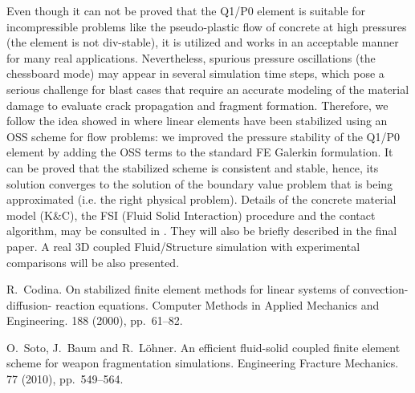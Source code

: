 Even though it can not be proved that the Q1/P0 element is suitable for incompressible problems like the pseudo-plastic flow of concrete at high pressures (the element is not div-stable), it is utilized and works in an acceptable manner for many real applications. Nevertheless, spurious pressure oscillations (the chessboard mode) may appear in several simulation time steps, which pose a serious challenge for blast cases that require an accurate modeling of the material damage to evaluate crack propagation and fragment formation. Therefore, we follow the idea showed in \cite{ref1} where linear elements have been stabilized using an OSS scheme
for flow problems: we improved the pressure stability of the Q1/P0  element by adding the OSS terms to the standard FE Galerkin formulation. It can be proved that the stabilized scheme is consistent and stable, hence, its solution converges to the solution of the boundary value problem that is being approximated (i.e. the right physical problem). Details of the concrete material model (K\&C), the FSI (Fluid Solid Interaction) procedure and the contact algorithm, may be consulted in \cite{ref3}. They will also be briefly described in the final paper. A real 3D coupled Fluid/Structure simulation with experimental comparisons will be also presented.


\begin{thebibliography}{10}

{\sc R.~Codina}. {On stabilized finite element methods for linear systems of convection-diffusion- reaction equations}. Computer Methods in Applied
Mechanics and Engineering. 188 (2000), pp.~61--82.

{\sc O.~Soto, J.~Baum and R.~L\"ohner}. {An efficient fluid-solid coupled finite element scheme for weapon fragmentation simulations}. Engineering
Fracture Mechanics. 77 (2010), pp.~549--564.

\end{thebibliography}